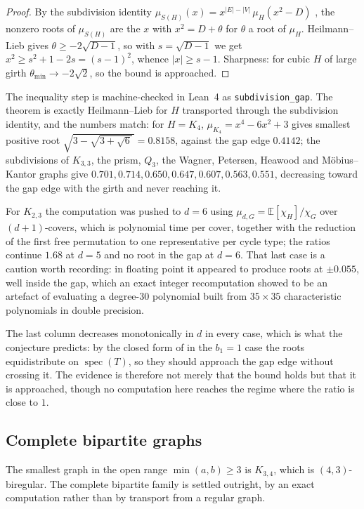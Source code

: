\documentclass[11pt]{article}
\theoremstyle{remark}
\newcommand{\E}{\mathbb{E}}
\begin{document}
\begin{proof}
By the subdivision identity $\mu_{S(H)}(x)=x^{|E|-|V|}\,\mu_H(x^2-D)$
\cite{WWM}, the nonzero roots of $\mu_{S(H)}$ are the $x$ with $x^2=D+\theta$
for $\theta$ a root of $\mu_H$. Heilmann--Lieb gives $\theta\ge-2\sqrt{D-1}$,
so with $s=\sqrt{D-1}$ we get $x^2\ge s^2+1-2s=(s-1)^2$, whence
$|x|\ge s-1$. Sharpness: for cubic $H$ of large girth $\theta_{\min}\to-2\sqrt2$,
so the bound is approached.
\end{proof}

The inequality step is machine-checked in Lean~4 as \texttt{subdivision\_gap}.
The theorem is exactly Heilmann--Lieb for $H$ transported through the
subdivision identity, and the numbers match: for $H=K_4$, $\mu_{K_4}=x^4-6x^2+3$
gives smallest positive root $\sqrt{3-\sqrt{3+\sqrt6}\,}=0.8158$, against the
gap edge $0.4142$; the subdivisions of $K_{3,3}$, the prism, $Q_3$, the Wagner,
Petersen, Heawood and M\"obius--Kantor graphs give
$0.701,0.714,0.650,0.647,0.607,0.563,0.551$, decreasing toward the gap edge
with the girth and never reaching it.

For $K_{2,3}$ the computation was pushed to $d=6$ using
$\mu_{d,G}=\E[\chi_H]/\chi_G$ over $(d+1)$-covers, which is polynomial time per
cover, together with the reduction of the first free permutation to one
representative per cycle type; the ratios continue
$1.68$ at $d=5$ and no root in the gap at $d=6$. That last case is a caution
worth recording: in floating point it appeared to produce roots at
$\pm0.055$, well inside the gap, which an exact integer recomputation showed to
be an artefact of evaluating a degree-$30$ polynomial built from $35\times35$
characteristic polynomials in double precision.

 The last column decreases monotonically in $d$ in
every case, which is what the conjecture predicts: by
the closed form of \cite{PartI} in the $b_1=1$ case the roots equidistribute on
$\operatorname{spec}(T)$, so they should approach the gap edge without crossing
it. The evidence is therefore not merely that the bound holds but that it is
approached, though no computation here reaches the regime where the ratio is
close to $1$.

\subsection{Complete bipartite graphs}\label{sec:kpq}

The smallest graph in the open range $\min(a,b)\ge3$ is $K_{3,4}$, which is
$(4,3)$-biregular. The complete bipartite family is settled outright, by an exact
computation rather than by transport from a regular graph.
\end{document}
